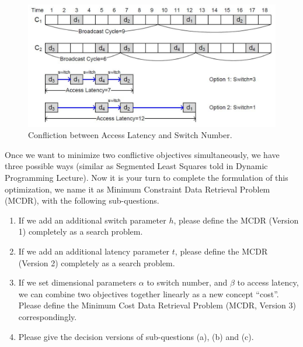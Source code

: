 \documentclass[12pt,a4paper]{article}
\theoremstyle{definition}
\begin{document}
\begin{enumerate}
\begin{figure}[!htbp]
	\centering
	\includegraphics[scale= 0.5]{Fig-Conflict.pdf}
	\caption{Confliction between Access Latency and Switch Number.} \label{Fig-Conflict}
\end{figure}

Once we want to minimize two conflictive objectives simultaneously, we have three possible ways (similar as Segmented Least Squares told in Dynamic Programming Lecture). Now it is your turn to complete the formulation of this optimization, we name it as Minimum Constraint Data Retrieval Problem (MCDR), with the following sub-questions.
\begin{enumerate}
	\item If we add an additional switch parameter $h$, please define the MCDR (Version 1) completely as a search problem.
	\item If we add an additional latency parameter $t$, please define the MCDR (Version 2) completely as a search problem.
	\item If we set dimensional parameters $\alpha$ to switch number, and $\beta$ to access latency, we can combine two objectives together linearly as a new concept ``cost''. Please define the Minimum Cost Data Retrieval Problem (MCDR, Version 3) correspondingly.
	\item Please give the decision versions of sub-questions (a), (b) and (c).
\end{enumerate}


\end{enumerate}
\end{document}
